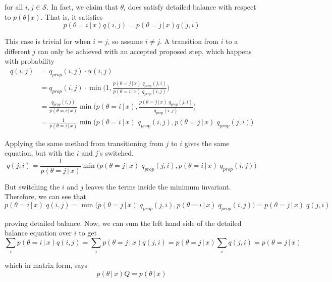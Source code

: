   for all $i, j \in \mathcal{S}$. In fact, we claim that $\theta_i$ does satisfy detailed balance with respect to $p(\theta\,|\,x)$. That is, it satisfies
  \begin{equation}
    p(\theta = i\,|\,x) q(i, j) = p(\theta = j\,|\,x) q(j, i)
  \end{equation}

  This case is trivial for when $i=j$, so assume $i \neq j$. A transition from $i$ to a different $j$ can only be achieved with an accepted proposed step, which happens with probability
  \begin{align*}
    q(i, j) & = q_{prop} (i, j) \cdot \alpha(i, j) \\
    & = q_{prop} (i, j) \cdot \min\bigg( 1, \frac{p(\theta = j\,|\,x)\; q_{prop} (j, i)}{p(\theta = i\,|\,x) \; q_{prop}(i, j)}\bigg) \\
    & = \frac{q_{prop} (i, j)}{p(\theta = i\,|\,x)} \min\big( p(\theta = i\,|\,x), \frac{p(\theta = j\,|\,x)\; q_{prop} (j, i)}{q_{prop}(i, j)} \big) \\
    & = \frac{1}{p(\theta = i\,|\,x)} \min \big( p(\theta = i\,|\,x)\; q_{prop} (i, j), p(\theta = j\,|\,x) \; q_{prop} (j, i) \big)
  \end{align*}

  Applying the same method from transitioning from $j$ to $i$ gives the same equation, but with the $i$ and $j$'s switched.
  \begin{equation}
    q(j, i) = \frac{1}{p(\theta = j\,|\,x)} \min \big( p(\theta = j\,|\,x)\; q_{prop} (j, i), p(\theta = i\,|\,x) \; q_{prop} (i, j) \big)
  \end{equation}

  But switching the $i$ and $j$ leaves the terms inside the minimum invariant. Therefore, we can see that
  \begin{equation}
    p(\theta = i\,|\,x)\; q(i, j) = \min \big( p(\theta = j\,|\,x)\; q_{prop} (j, i), p(\theta = i\,|\,x) \; q_{prop} (i, j) \big) = p(\theta = j\,|\,x)\; q(j, i)
  \end{equation}

  proving detailed balance. Now, we can sum the left hand side of the detailed balance equation over $i$ to get
  \begin{equation}
    \sum_i p(\theta = i\,|\,x) q(i, j) = \sum_i p(\theta = j\,|\,x) q(j, i) = p(\theta = j\,|\,x) \sum_i q(j, i) = p(\theta = j\,|\,x)
  \end{equation}

  which in matrix form, says
  \begin{equation}
    p(\theta\,|\,x) Q = p(\theta\,|\,x)
  \end{equation}

